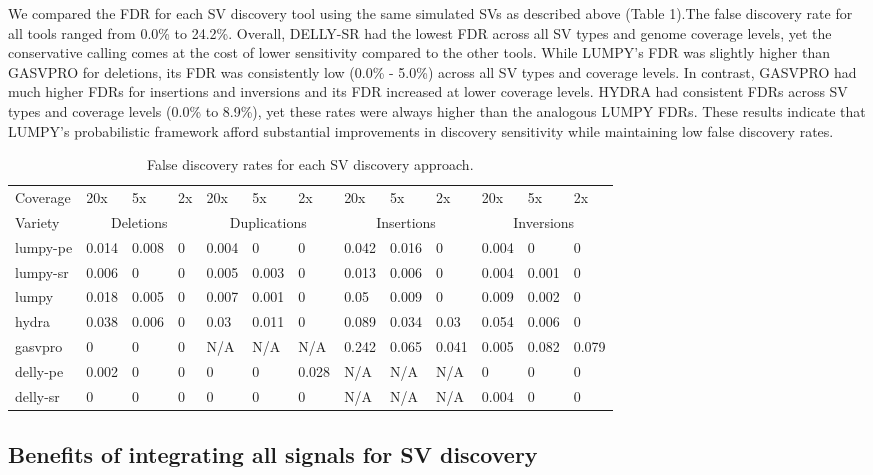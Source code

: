 \documentclass[10pt]{bmc_article}
\newenvironment{bmcformat}{\begin{raggedright}\baselineskip20pt\sloppy\setboolean{publ}{false}}{\end{raggedright}\baselineskip20pt\sloppy}
\begin{document}
\begin{bmcformat}
We compared the FDR for each SV discovery tool using the same simulated
SVs as described above (Table 1).The false discovery rate for all tools ranged
from 0.0\% to 24.2\%. Overall, DELLY-SR had the lowest FDR across all SV types
and genome coverage levels, yet the conservative calling comes at the cost of
lower sensitivity compared to the other tools. While LUMPY's FDR was
slightly higher than GASVPRO for deletions, its FDR was consistently
low (0.0\% - 5.0\%) across all SV types and coverage levels. In contrast,
GASVPRO had much higher FDRs for insertions and inversions and
its FDR increased at lower coverage levels.  HYDRA had consistent FDRs across
SV types and coverage levels (0.0\% to 8.9\%), yet these rates were always
higher than the analogous LUMPY FDRs. These results indicate that LUMPY's
probabilistic framework afford substantial improvements in discovery
sensitivity while maintaining low false discovery rates.

\begin{table}[h!b!p!]
\small
\caption{False discovery rates for each SV discovery approach.}
\begin{tabular}{l|lll|lll|lll|lll}
		Coverage
		&20x&5x&2x &20x&5x&2x &20x&5x&2x &20x&5x&2x \\
\cline{1-13}
			Variety
			&\multicolumn{3}{c}{Deletions}
			&\multicolumn{3}{|c}{Duplications}
			&\multicolumn{3}{|c}{Insertions}
			&\multicolumn{3}{|c}{Inversions} \\
\cline{1-13}
lumpy-pe		&0.014&0.008&0&0.004&0	  &0    &0.042&0.016&0	  &0.004&0	  &0 \\
lumpy-sr      &0.006&0	&0&0.005&0.003&0	&0.013&0.006&0	  &0.004&0.001&0 \\
lumpy    &0.018&0.005&0&0.007&0.001&0	&0.05 &0.009&0	  &0.009&0.002&0 \\
hydra   &0.038&0.006&0&0.03 &0.011&0	&0.089&0.034&0.03 &0.054&0.006&0 \\
gasvpro	&0	  &0	&0&N/A  &N/A  &N/A  &0.242&0.065&0.041&0.005&0.082&0.079 \\
delly-pe	&0.002&0	&0&0	&0	  &0.028&N/A  &N/A	&N/A  &0	&0	  &0 \\
delly-sr	&0	  &0	&0&0	&0	  &0	&N/A  &N/A	&N/A  &0.004&0	  &0 \\

\end{tabular}
\label{table:fdr}
\end{table}


\subsection*{Benefits of integrating all signals for SV discovery}


\end{bmcformat}
\end{document}
